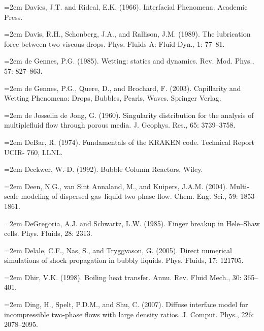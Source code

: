 \documentclass[11pt,a4paper,openany,fontset=none]{ctexbook}
\begin{document}
\par\hangindent=2em Davies, J.T. and Rideal, E.K. (1966). Interfacial Phenomena. Academic Press.

\par\hangindent=2em Davis, R.H., Schonberg, J.A., and Rallison, J.M. (1989). The lubrication force between two viscous drops. Phys. Fluids A: Fluid Dyn., 1: 77--81.

\par\hangindent=2em de Gennes, P.G. (1985). Wetting: statics and dynamics. Rev. Mod. Phys., 57: 827--863.

\par\hangindent=2em de Gennes, P.G., Quere, D., and Brochard, F. (2003). Capillarity and Wetting Phenomena: Drops, Bubbles, Pearls, Waves. Springer Verlag.

\par\hangindent=2em de Josselin de Jong, G. (1960). Singularity distribution for the analysis of multiplefluid flow through porous media. J. Geophys. Res., 65: 3739--3758.

\par\hangindent=2em DeBar, R. (1974). Fundamentals of the KRAKEN code. Technical Report UCIR- 760, LLNL.

\par\hangindent=2em Deckwer, W.-D. (1992). Bubble Column Reactors. Wiley.

\par\hangindent=2em Deen, N.G., van Sint Annaland, M., and Kuipers, J.A.M. (2004). Multi-scale modeling of dispersed gas--liquid two-phase flow. Chem. Eng. Sci., 59: 1853--1861.

\par\hangindent=2em DeGregoria, A.J. and Schwartz, L.W. (1985). Finger breakup in Hele--Shaw cells. Phys. Fluids, 28: 2313.

\par\hangindent=2em Delale, C.F., Nas, S., and Tryggvason, G. (2005). Direct numerical simulations of shock propagation in bubbly liquids. Phys. Fluids, 17: 121705.

\par\hangindent=2em Dhir, V.K. (1998). Boiling heat transfer. Annu. Rev. Fluid Mech., 30: 365--401.

\par\hangindent=2em Ding, H., Spelt, P.D.M., and Shu, C. (2007). Diffuse interface model for incompressible two-phase flows with large density ratios. J. Comput. Phys., 226: 2078--2095.
\end{document}
